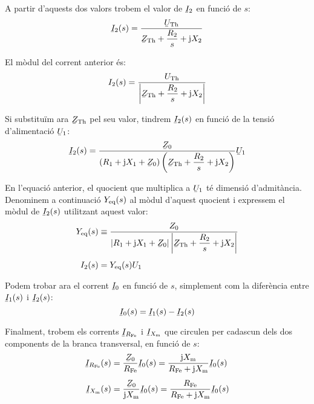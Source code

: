 A partir d'aquests dos valors trobem el valor de $\cmplx{I}_2$ en funció de $s$:
\begin{equation}
    \cmplx{I}_2(s) = \frac{\cmplx{U}\ped{Th}}{\cmplx{Z}\ped{Th} + \dfrac{R_2}{s} + \ju X_2}
\end{equation}

El mòdul del corrent anterior és:
\begin{equation}
    I_2(s) = \frac{U\ped{Th}}{\left|\cmplx{Z}\ped{Th} + \dfrac{R_2}{s} + \ju X_2\right|} \label{eq-mot-I2}
\end{equation}

Si substituïm  ara $\cmplx{Z}\ped{Th}$ pel seu valor, tindrem $\cmplx{I}_2(s)$ en funció de la tensió d'alimentació $\cmplx{U}_1$:
\begin{equation}
    \cmplx{I}_2(s) = \frac{\cmplx{Z}_0}{(R_1 + \ju X_1 + \cmplx{Z}_0)\left(\cmplx{Z}\ped{Th} + \dfrac{R_2}{s} + \ju X_2\right)} \cmplx{U}_1
\end{equation}

En l'equació anterior, el quocient que multiplica a $\cmplx{U}_1$ té dimensió d'admitància. Denominem a continuació $Y_\mathrm{eq}(s)$ al mòdul d'aquest quocient i expressem el mòdul de $\cmplx{I}_2(s)$ utilitzant aquest valor:
\begin{subequations}
\begin{align}
    Y\ped{eq}(s) &\equiv \frac{Z_0}{\left|R_1 + \ju X_1 + \cmplx{Z}_0\right| \left|\cmplx{Z}\ped{Th} + \dfrac{R_2}{s} + \ju X_2\right|}  \\[1ex]
    I_2(s) &= Y\ped{eq}(s) U_1
\end{align}
\end{subequations}

Podem trobar ara el corrent $\cmplx{I}_0$ en funció de $s$, simplement com la diferència entre  $\cmplx{I}_1(s)$ i  $\cmplx{I}_2(s)$:
\begin{equation}
    \cmplx{I}_0(s) = \cmplx{I}_1(s) - \cmplx{I}_2(s)
\end{equation}

Finalment,  trobem els corrents $\cmplx{I}_{R\ped{Fe}}$ i $\cmplx{I}_{X\ped{m}}$ que circulen per cadascun dels dos components de la branca transversal, en funció de $s$:
\begin{subequations}
\begin{align}
    \cmplx{I}_{R\ped{Fe}}(s) &= \frac{\cmplx{Z}_0}{R\ped{Fe}} \cmplx{I}_0(s) = \frac{\ju X\ped{m}}{ R\ped{Fe} + \ju X\ped{m}}  \cmplx{I}_0(s) \\[1ex]
    \cmplx{I}_{X\ped{m}}(s) &= \frac{\cmplx{Z}_0}{\ju X\ped{m}} \cmplx{I}_0(s) = \frac{
    R\ped{Fe}}{ R\ped{Fe} + \ju X\ped{m}}  \cmplx{I}_0(s)
\end{align}
\end{subequations}

